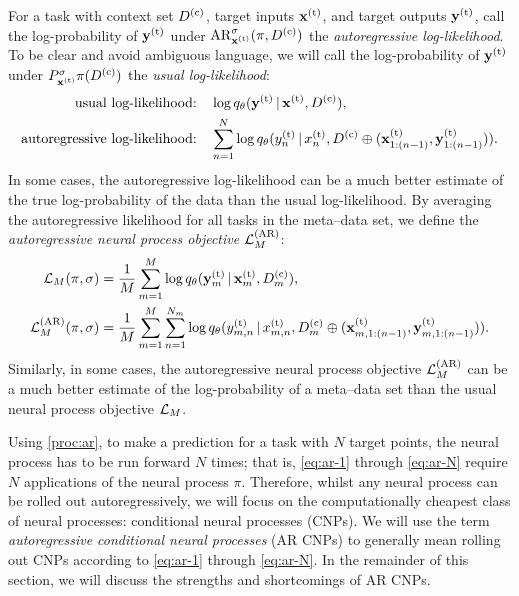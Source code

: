 \documentclass[12pt]{report}
\begin{document}
For a task with context set $D\us{(c)}$, target inputs $\vx\us{(t)}$, and target outputs $\vy\us{(t)}$,
call the log-probability of $\vy\us{(t)}$ under $\AR^\sigma_{\vx\us{(t)}}(\pi, D\us{(c)})$ the \emph{autoregressive log-likelihood}.
To be clear and avoid ambiguous language, we will call the log-probability of $\vy\us{(t)}$ under $P_{\vx\us{(t)}}^\sigma \pi(D\us{(c)})$ the \emph{usual log-likelihood}:
\begin{align}
    \text{usual log-likelihood:}\quad& 
    \log q_\theta(\vy\us{(t)} \cond \vx\us{(t)}, D\us{(c)}), \\
    \text{autoregressive log-likelihood:}\quad& 
    \sum_{n=1}^{N} \log q_\theta(y\us{(t)}_{n} \cond x\us{(t)}_n, D\us{(c)} \oplus (\vx\us{(t)}_{1:(n-1)}, \vy\us{(t)}_{1:(n-1)})).
\end{align}
In some cases, the autoregressive log-likelihood can be a much better estimate of the true log-probability of the data than the usual log-likelihood.
By averaging the autoregressive likelihood for all tasks in the meta--data set, we define the \emph{autoregressive neural process objective} $\L\us{(AR)}_M$: 
\begin{align}
    \L_M(\pi, \sigma) &= \frac1M\sum_{m=1}^M \log q_\theta(\vy\us{(t)}_m \cond \vx\us{(t)}_m, D\us{(c)}_m), \\
    \L\us{(AR)}_M(\pi, \sigma) &= \frac1M \sum_{m=1}^M \sum_{n=1}^{N_m} \log q_\theta(y\us{(t)}_{m,n} \cond x\us{(t)}_{m,n}, D\us{(c)}_m \oplus (\vx\us{(t)}_{m,1:(n-1)}, \vy\us{(t)}_{m,1:(n-1)})).
    \label{eq:ar_neural_process_objective}
\end{align}
Similarly, in some cases, the autoregressive neural process objective $\L\us{(AR)}_M$ can be a much better estimate of the log-probability of a meta--data set than the usual neural process objective $\mathcal{L}_M$.

Using \cref{proc:ar},
to make a prediction for a task with $N$ target points, the neural process has to be run forward $N$ times;
that is, \eqref{eq:ar-1} through \eqref{eq:ar-N} require $N$ applications of the neural process $\pi$.
Therefore, whilst any neural process can be rolled out autoregressively, we will focus on the computationally cheapest class of neural processes: conditional neural processes (CNPs).
We will use the term \emph{autoregressive conditional neural processes} (AR CNPs) to generally mean rolling out CNPs according to \eqref{eq:ar-1} through \eqref{eq:ar-N}.
In the remainder of this section, we will discuss the strengths and shortcomings of AR CNPs.
\end{document}
